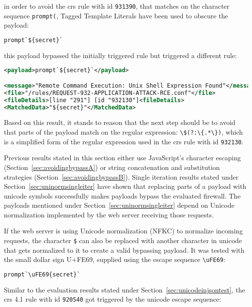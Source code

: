 in order to avoid the \acrshort{crs} rule with id \verb|931390|, that matches on the character sequence \verb|prompt(|, Tagged Template Literals have been used to obscure the payload:

\begin{lstlisting}[style=basicStyle, escapeinside=\^\^, language=Python]
prompt`${secret}`
\end{lstlisting}

this payload bypassed the initially triggered rule but triggered a different rule:

\begin{lstlisting}[style=ruleStyle, language=XML]
<payload>prompt`${secret}`</payload>

<message>"Remote Command Execution: Unix Shell Expression Found"</message>
<file>"/rules/REQUEST-932-APPLICATION-ATTACK-RCE.conf"</file>
<fileDetails>[line "291"] [id "932130"]<fileDetails>
<MatchedData>"${secret}"</MatchedData>
\end{lstlisting}

Based on this result, it stands to reason that the next step should be to avoid that parts of the payload match on the regular expression: \verb|\$(?:\{.*\})|, which is a simplified form of the regular expression used in the \acrshort{crs} rule with id \verb|932130|.

Previous results stated in this section either use JavaScript's character escaping (Section~\ref{sec:avoidingbypassA}) or string concatenation and substitution strategies (Section~\ref{sec:avoidingbypassB}). Single iteration results stated under Section~\ref{sec:uninormsingleiter} have shown that replacing parts of a payload with unicode symbols successfully makes payloads bypass the evaluated firewall. The payloads mentioned under Section~\ref{sec:uninormsingleiter} depend on Unicode normalization implemented by the web server receiving those requests.

If the web server is using Unicode normalization (NFKC) to normalize incoming requests, the character \verb|$| can also be replaced with another character in unicode that gets normalized to it to create a valid bypassing payload. It was tested with the small dollar sign U+FE69, supplied using the escape sequence \verb|\uFE69|:

\begin{lstlisting}[style=basicStyle, language=Python]
prompt`\uFE69{secret}`
\end{lstlisting}

Similar to the evaluation results stated under Section~\ref{sec:unicodeinjsontest}, the \acrshort{crs} 4.1 rule with id \verb|920540| got triggered by the unicode escape sequence:

